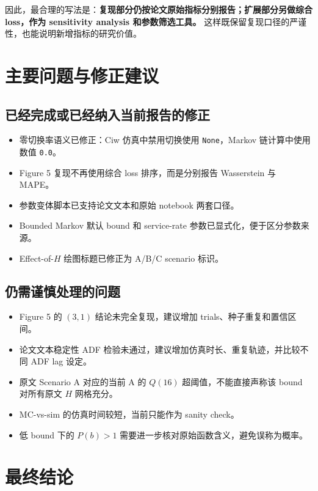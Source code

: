 \documentclass[UTF8,a4paper,11pt]{ctexart}
\newcommand{\code}[1]{\texttt{#1}}
\begin{document}
因此，最合理的写法是：\textbf{复现部分仍按论文原始指标分别报告；扩展部分另做综合 loss，作为 sensitivity analysis 和参数筛选工具。} 这样既保留复现口径的严谨性，也能说明新增指标的研究价值。

\section{主要问题与修正建议}

\subsection{已经完成或已经纳入当前报告的修正}

\begin{itemize}
  \item 零切换率语义已修正：Ciw 仿真中禁用切换使用 \code{None}，Markov 链计算中使用数值 \code{0.0}。
  \item Figure 5 复现不再使用综合 loss 排序，而是分别报告 Wasserstein 与 MAPE。
  \item 参数变体脚本已支持论文文本和原始 notebook 两套口径。
  \item Bounded Markov 默认 bound 和 service-rate 参数已显式化，便于区分参数来源。
  \item Effect-of-$H$ 绘图标题已修正为 A/B/C scenario 标识。
\end{itemize}

\subsection{仍需谨慎处理的问题}

\begin{itemize}
  \item Figure 5 的 $(3,1)$ 结论未完全复现，建议增加 trials、种子重复和置信区间。
  \item 论文文本稳定性 ADF 检验未通过，建议增加仿真时长、重复轨迹，并比较不同 ADF lag 设定。
  \item 原文 Scenario A 对应的当前 A 的 $Q(16)$ 超阈值，不能直接声称该 bound 对所有原文 $H$ 网格充分。
  \item MC-vs-sim 的仿真时间较短，当前只能作为 sanity check。
  \item 低 bound 下的 $P(b)>1$ 需要进一步核对原始函数含义，避免误称为概率。
\end{itemize}

\section{最终结论}
\end{document}
